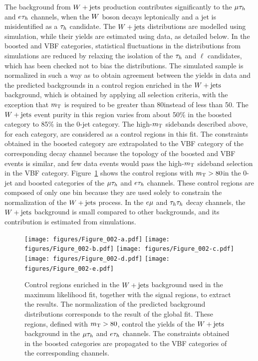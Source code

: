 The background from $W+\text{jets}$ production contributes significantly to the
$\mu\tau_{h}$ and $e\tau_{h}$ channels, when the $W$ boson decays leptonically and
a jet is misidentified as a $\tau_{h}$ candidate.
The $W+\text{jets}$ distributions are modelled using simulation, while their yields are estimated using data, as detailed below. In the boosted and VBF categories, statistical fluctuations in the distributions from simulations are reduced by relaxing the isolation of the $\tau_{h}$ and $\ell$ candidates, which has been checked not to bias the distributions.
The simulated sample is normalized in such a way as to obtain agreement between the yields in data and the predicted backgrounds in a control region enriched in the $W+\text{jets}$ background,
which is obtained by applying all selection criteria,
with the exception that $m_\mathrm{T}$ is required to be greater than 80\GeV instead of less than 50\GeV.
The $W+\text{jets}$ event purity in this
region varies from about 50\% in the boosted category to 85\% in the 0-jet category.
The high-$m_\mathrm{T}$ sidebands described above, for each category, are considered
as a control regions in this fit.
 The constraints obtained in the boosted category are extrapolated to the VBF category of the corresponding decay channel because
the topology of the boosted and VBF events is similar, and few data events would pass the high-$m_\mathrm{T}$ sideband selection in the VBF category. Figure~\ref{fig:CR1} shows the control regions with $m_\mathrm{T}>80$\GeV in the 0-jet and boosted categories of the $\mu\tau_{h}$ and $e\tau_{h}$ channels. These control regions are composed of only one bin because they are used solely to constrain the normalization of the $W+\text{jets}$ process.
In the $e\mu$ and $\tau_{h}\tau_{h}$ decay channels, the $W+\text{jets}$
background is small compared to other backgrounds, and its contribution is
estimated from simulations.

\begin{figure}[!htbp]
\centering
     \texttt{[image: figures/Figure\_002-a.pdf]}
     \texttt{[image: figures/Figure\_002-b.pdf]}
     \texttt{[image: figures/Figure\_002-c.pdf]}
     \texttt{[image: figures/Figure\_002-d.pdf]}
     \texttt{[image: figures/Figure\_002-e.pdf]}
     \caption{Control regions enriched in the $W+\text{jets}$ background used in the maximum likelihood fit, together with the signal regions, to extract the results. The normalization of the predicted background distributions corresponds to the result of the global fit. These regions, defined with $m_\mathrm{T}>80$\GeV,  control the
yields of the $W+\text{jets}$ background in the $\mu\tau_{h}$ and $e\tau_{h}$ channels.  The constraints obtained in the boosted categories are propagated to the VBF categories of the corresponding channels.}
     \label{fig:CR1}
\end{figure}


